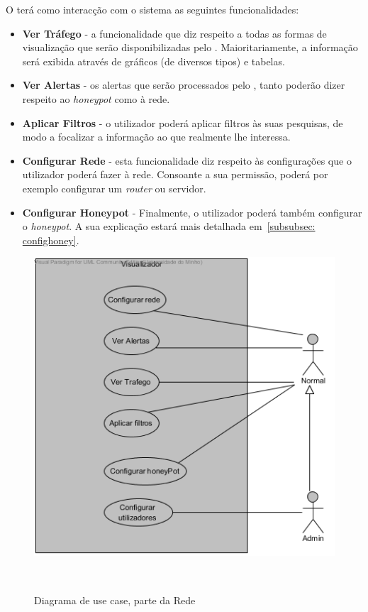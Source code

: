 O \uticomum terá como interacção com o sistema as seguintes funcionalidades:

\begin{itemize}
 \item \textbf{Ver Tráfego} - a funcionalidade que diz respeito a todas as formas de visualização que serão disponibilizadas pelo \visualz. Maioritariamente, a informação será exibida através de gráficos (de diversos tipos) e tabelas.
 \item \textbf{Ver Alertas} - os alertas que serão processados pelo \visualz, tanto poderão dizer respeito ao \emph{honeypot} como à rede.
 \item \textbf{Aplicar Filtros} - o utilizador poderá aplicar filtros às suas pesquisas, de modo a focalizar a informação ao que realmente lhe interessa.
 \item \textbf{Configurar Rede} - esta funcionalidade diz respeito às configurações que o utilizador poderá fazer à rede. Consoante a sua permissão, poderá por exemplo configurar um \emph{router} ou servidor.
 \item \textbf{Configurar Honeypot} - Finalmente, o utilizador poderá também configurar o \emph{honeypot}. A sua explicação estará mais detalhada em~\ref{subsubsec: confighoney}.
\end{itemize}

\begin{figure}[!htb]
	\centering
	\includegraphics[scale=0.80]{images/ucs/Visualizador}
	\caption {Diagrama de use case, parte da Rede}~\label{fig: casodeusovisual}
\end{figure}
\pagebreak

